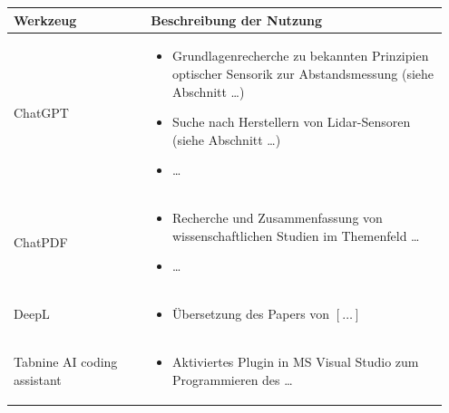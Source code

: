\documentclass{scrbook} %
\begin{document}
\begin{table}[hbt]    
    \centering
    \renewcommand{\arraystretch}{1.5}    %
    \label{tab:anhang_uebersicht_KI_werkzeuge}
    \begin{tabular}{>{\raggedright\arraybackslash}p{0.3\linewidth} >{\raggedright\arraybackslash}p{0.65\linewidth}}
        \textbf{Werkzeug} & \textbf{Beschreibung der Nutzung}\\
        \hline 
        \hline
        ChatGPT &     \vspace{-\topsep}
                    \begin{itemize}[noitemsep,topsep=0pt,partopsep=0pt,parsep=0pt] 
                        \item Grundlagenrecherche zu bekannten Prinzipien optischer Sensorik zur Abstandsmessung (siehe Abschnitt \ldots)
                        \item Suche nach Herstellern von Lidar-Sensoren (siehe Abschnitt \ldots)
                        \item \ldots
                    \end{itemize} \\
        ChatPDF &    \vspace{-\topsep}
                    \begin{itemize}[noitemsep,topsep=0pt,partopsep=0pt,parsep=0pt] 
                    \item Recherche und Zusammenfassung von wissenschaftlichen Studien im Themenfeld \ldots
                    \item \ldots
                    \end{itemize} \\ 
        DeepL    &    \vspace{-\topsep}
                    \begin{itemize}[noitemsep,topsep=0pt,partopsep=0pt,parsep=0pt] 
                    \item Übersetzung des Papers von $[\ldots]$
                    \end{itemize} \\ 
        Tabnine AI coding assistant &    \vspace{-\topsep}
                            \begin{itemize}[noitemsep,topsep=0pt,partopsep=0pt,parsep=0pt] 
                            \item Aktiviertes Plugin in MS Visual Studio zum Programmieren des \ldots

\end{itemize}
\end{tabular}
\end{table}
\end{document}

